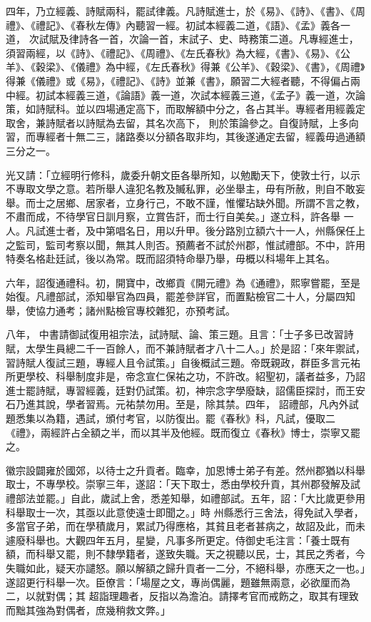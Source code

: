 \begin{pinyinscope}
 四年，乃立經義、詩賦兩科，罷試律義。凡詩賦進士，於《易》、《詩》、《書》、《周禮》、《禮記》、《春秋左傳》內聽習一經。初試本經義二道，《語》、《孟》義各一道，
 次試賦及律詩各一首，次論一首，末試子、史、時務策二道。凡專經進士，須習兩經，以《詩》、《禮記》、《周禮》、《左氏春秋》為大經，《書》、《易》、《公羊》、《穀梁》、《儀禮》為中經，《左氏春秋》得兼《公羊》、《穀梁》、《書》，《周禮》得兼《儀禮》或《易》，《禮記》、《詩》並兼《書》，願習二大經者聽，不得偏占兩中經。初試本經義三道，《論語》義一道，次試本經義三道，《孟子》義一道，次論策，如詩賦科。並以四場通定高下，而取解額中分之，各占其半。專經者用經義定取舍，兼詩賦者以詩賦為去留，其名次高下，
 則於策論參之。自復詩賦，上多向習，而專經者十無二三，諸路奏以分額各取非均，其後遂通定去留，經義毋過通額三分之一。



 光又請：「立經明行修科，歲委升朝文臣各舉所知，以勉勵天下，使敦士行，以示不專取文學之意。若所舉人違犯名教及贓私罪，必坐舉主，毋有所赦，則自不敢妄舉。而士之居鄉、居家者，立身行己，不敢不謹，惟懼玷缺外聞。所謂不言之教，不肅而成，不待學官日訓月察，立賞告訐，而士行自美矣。」遂立科，許各舉
 一人。凡試進士者，及中第唱名日，用以升甲。後分路別立額六十一人，州縣保任上之監司，監司考察以聞，無其人則否。預薦者不試於州郡，惟試禮部。不中，許用特奏名格赴廷試，後以為常。既而詔須特命舉乃舉，毋概以科場年上其名。



 六年，詔復通禮科。初，開寶中，改鄉貢《開元禮》為《通禮》，熙寧嘗罷，至是始復。凡禮部試，添知舉官為四員，罷差參詳官，而置點檢官二十人，分屬四知舉，使協力通考；諸州點檢官專校雜犯，亦預考試。



 八年，
 中書請御試復用祖宗法，試詩賦、論、策三題。且言：「士子多已改習詩賦，太學生員總二千一百餘人，而不兼詩賦者才八十二人。」於是詔：「來年禦試，習詩賦人復試三題，專經人且令試策。」自後概試三題。帝既親政，群臣多言元祐所更學校、科舉制度非是，帝念宣仁保祐之功，不許改。紹聖初，議者益多，乃詔進士罷詩賦，專習經義，廷對仍試策。初，神宗念字學廢缺，詔儒臣探討，而王安石乃進其說，學者習焉。元祐禁勿用。至是，除其禁。四年，
 詔禮部，凡內外試題悉集以為籍，遇試，頒付考官，以防復出。罷《春秋》科，凡試，優取二《禮》，兩經許占全額之半，而以其半及他經。既而復立《春秋》博士，崇寧又罷之。



 徽宗設闢雍於國郊，以待士之升貢者。臨幸，加恩博士弟子有差。然州郡猶以科舉取士，不專學校。崇寧三年，遂詔：「天下取士，悉由學校升貢，其州郡發解及試禮部法並罷。」自此，歲試上舍，悉差知舉，如禮部試。五年，詔：「大比歲更參用科舉取士一次，其亟以此意使遠士即聞之。」時
 州縣悉行三舍法，得免試入學者，多當官子弟，而在學積歲月，累試乃得應格，其貧且老者甚病之，故詔及此，而未遽廢科舉也。大觀四年五月，星變，凡事多所更定。侍御史毛注言：「養士既有額，而科舉又罷，則不隸學籍者，遂致失職。天之視聽以民，士，其民之秀者，今失職如此，疑天亦譴怒。願以解額之歸升貢者一二分，不絕科舉，亦應天之一也。」遂詔更行科舉一次。臣僚言：「場屋之文，專尚偶麗，題雖無兩意，必欲厘而為二，以就對偶；其
 超詣理趣者，反指以為澹泊。請擇考官而戒飭之，取其有理致而黜其強為對偶者，庶幾稍救文弊。」




\end{pinyinscope}
